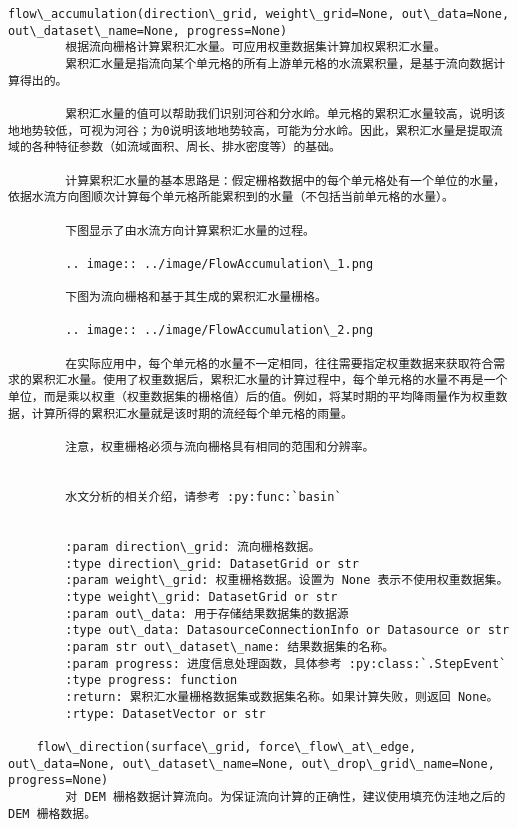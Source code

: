 \documentclass[11pt]{article}
\begin{document}
\begin{Verbatim}[commandchars=\\\{\}]
    flow\_accumulation(direction\_grid, weight\_grid=None, out\_data=None, out\_dataset\_name=None, progress=None)
        根据流向栅格计算累积汇水量。可应用权重数据集计算加权累积汇水量。
        累积汇水量是指流向某个单元格的所有上游单元格的水流累积量，是基于流向数据计算得出的。
        
        累积汇水量的值可以帮助我们识别河谷和分水岭。单元格的累积汇水量较高，说明该地地势较低，可视为河谷；为0说明该地地势较高，可能为分水岭。因此，累积汇水量是提取流域的各种特征参数（如流域面积、周长、排水密度等）的基础。
        
        计算累积汇水量的基本思路是：假定栅格数据中的每个单元格处有一个单位的水量，依据水流方向图顺次计算每个单元格所能累积到的水量（不包括当前单元格的水量）。
        
        下图显示了由水流方向计算累积汇水量的过程。
        
        .. image:: ../image/FlowAccumulation\_1.png
        
        下图为流向栅格和基于其生成的累积汇水量栅格。
        
        .. image:: ../image/FlowAccumulation\_2.png
        
        在实际应用中，每个单元格的水量不一定相同，往往需要指定权重数据来获取符合需求的累积汇水量。使用了权重数据后，累积汇水量的计算过程中，每个单元格的水量不再是一个单位，而是乘以权重（权重数据集的栅格值）后的值。例如，将某时期的平均降雨量作为权重数据，计算所得的累积汇水量就是该时期的流经每个单元格的雨量。
        
        注意，权重栅格必须与流向栅格具有相同的范围和分辨率。
        
        
        水文分析的相关介绍，请参考 :py:func:`basin`
        
        
        :param direction\_grid: 流向栅格数据。
        :type direction\_grid: DatasetGrid or str
        :param weight\_grid: 权重栅格数据。设置为 None 表示不使用权重数据集。
        :type weight\_grid: DatasetGrid or str
        :param out\_data: 用于存储结果数据集的数据源
        :type out\_data: DatasourceConnectionInfo or Datasource or str
        :param str out\_dataset\_name: 结果数据集的名称。
        :param progress: 进度信息处理函数，具体参考 :py:class:`.StepEvent`
        :type progress: function
        :return: 累积汇水量栅格数据集或数据集名称。如果计算失败，则返回 None。
        :rtype: DatasetVector or str
    
    flow\_direction(surface\_grid, force\_flow\_at\_edge, out\_data=None, out\_dataset\_name=None, out\_drop\_grid\_name=None, progress=None)
        对 DEM 栅格数据计算流向。为保证流向计算的正确性，建议使用填充伪洼地之后的 DEM 栅格数据。
        

\end{Verbatim}
\end{document}
